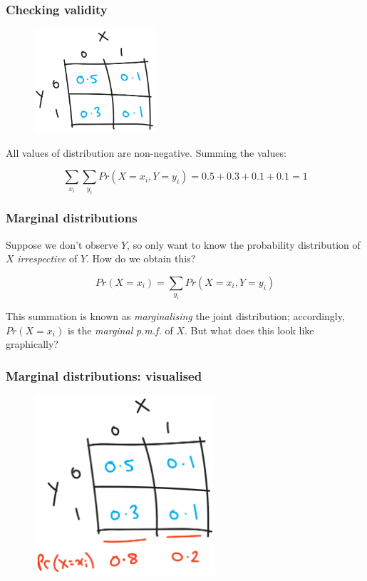 \documentclass{beamer}
\begin{document}
	\begin{frame}
		\frametitle{Checking validity}
		
		\begin{figure}[ht]
			\centerline{\includegraphics[width=0.4\textwidth]{./figures/horse_race_base.pdf}}
		\end{figure}
		
		All values of distribution are non-negative. Summing the values:
		
		\begin{equation}
		\sum_{x_i} \sum_{y_i} Pr(X=x_i, Y=y_i) = 0.5 + 0.3 + 0.1 + 0.1 = 1
		\end{equation}
		
	\end{frame}
	
	\begin{frame}
		\frametitle{Marginal distributions}
		
		Suppose we don't observe $Y$, so only want to know the probability distribution of $X$ \textit{irrespective} of $Y$. How do we obtain this?
		
		\begin{equation}
		Pr(X=x_i) = \sum_{y_i} Pr(X=x_i, Y=y_i)
		\end{equation}
		
		This summation is known as \textit{marginalising} the joint distribution; accordingly, $Pr(X=x_i)$ is the \textit{marginal} \textit{p.m.f.} of $X$. But what does this look like graphically? 
		
	\end{frame}
	
	\begin{frame}
		\frametitle{Marginal distributions: visualised}
		
			\begin{figure}[ht]
				\centerline{\includegraphics[width=0.6\textwidth]{./figures/horse_race_marginal.pdf}}
			\end{figure}
			
	\end{frame}
	
\end{document}
